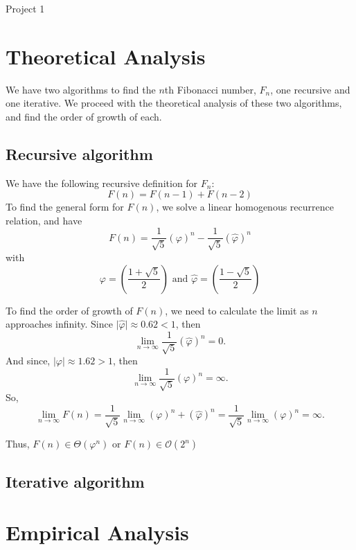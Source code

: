\documentclass[letterpaper, 11pt]{article}
\newcommand{\abs}[1]{\lvert #1 \rvert}
\begin{document}
\begin{center}
	{\LARGE Project 1}\\
\end{center}

\section*{Theoretical Analysis}
We have two algorithms to find the \(n\)th Fibonacci number, \(F_n\), one recursive and
one iterative. We proceed with the theoretical analysis of these two
algorithms, and find the order of growth of each.

\subsection*{Recursive algorithm}
We have the following recursive definition for \(F_n\): 
\[F(n) = F(n - 1) + F(n - 2) \]
To find the general form for \(F(n)\), we solve a linear homogenous recurrence
relation, and have
\[F(n) = \frac{1}{\sqrt{5}}(\varphi) ^ n - 
\frac{1}{\sqrt{5}} (\hat{\varphi}) ^ n\]
with
\[\varphi = \left(\frac{1 + \sqrt{5}}{2} \right) \text{ and } 
\hat{\varphi} = \left(\frac{1 - \sqrt{5}}{2} \right)\]

To find the order of growth of \(F(n)\), we need to calculate the limit as
\(n\) approaches infinity. Since \(\abs{\hat{\varphi}} \approx 0.62 < 1\), then
\[\lim_{n \to \infty} \frac{1}{\sqrt{5}} (\hat{\varphi})^n = 0.\]
And since, \(\abs{\varphi} \approx 1.62 > 1\), then 
\[\lim_{n \to \infty} \frac{1}{\sqrt{5}} (\varphi)^n = \infty.\]
So,
\[\lim_{n \to \infty} F(n) = \frac{1}{\sqrt{5}}\lim_{n \to \infty}(\varphi)^n +
(\hat{\varphi})^n = \frac{1}{\sqrt{5}}\lim_{n \to \infty}(\varphi)^n = \infty.\]

\medskip

Thus, \(F(n) \in \Theta(\varphi^n)\) or \(F(n) \in \mathcal{O}(2^n)\)

\subsection*{Iterative algorithm}


\section*{Empirical Analysis}
\end{document}
